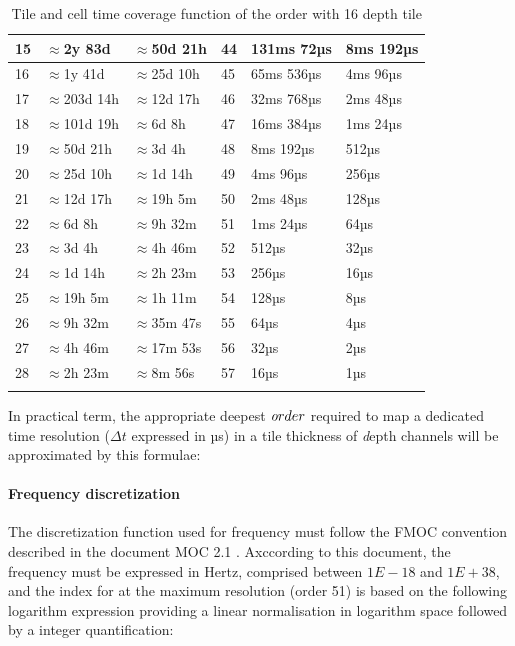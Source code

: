 \documentclass[11pt,a4paper]{ivoa}
\begin{document}
\begin{longtable}{|l|l|l||l|l|l|}
15 & $\approx$2y 83d & $\approx$50d 21h &
44 & 131ms 72µs & 8ms 192µs \\ \hline
16 & $\approx$1y 41d & $\approx$25d 10h &
45 & 65ms 536µs & 4ms 96µs \\ \hline
17 & $\approx$203d 14h & $\approx$12d 17h &
46 & 32ms 768µs & 2ms 48µs \\ \hline
18 & $\approx$101d 19h & $\approx$6d 8h &
47 & 16ms 384µs & 1ms 24µs \\ \hline
19 & $\approx$50d 21h & $\approx$3d 4h &
48 & 8ms 192µs & 512µs \\ \hline
20 & $\approx$25d 10h & $\approx$1d 14h &
49 & 4ms 96µs & 256µs \\ \hline
21 & $\approx$12d 17h & $\approx$19h 5m &
50 & 2ms 48µs & 128µs \\ \hline
22 & $\approx$6d 8h & $\approx$9h 32m &
51 & 1ms 24µs & 64µs \\ \hline
23 & $\approx$3d 4h & $\approx$4h 46m &
52 & 512µs & 32µs \\ \hline
24 & $\approx$1d 14h & $\approx$2h 23m &
53 & 256µs & 16µs \\ \hline
25 & $\approx$19h 5m & $\approx$1h 11m &
54 & 128µs & 8µs \\ \hline
26 & $\approx$9h 32m & $\approx$35m 47s &
55 & 64µs & 4µs \\ \hline
27 & $\approx$4h 46m & $\approx$17m 53s &
56 & 32µs & 2µs \\ \hline
28 & $\approx$2h 23m & $\approx$8m 56s &
57 & 16µs & 1µs \\ \hline


\caption{Tile and cell time coverage function of the order with 16 depth tile }
\label{tab:tabOrderTime}
\end{longtable}

In practical term, the appropriate deepest  ${\textit order}$ required to map a dedicated time resolution ($\Delta t$ expressed in µs) in a tile thickness of {\textit depth} channels will be approximated  by this formulae:\\
\medskip
\noindent{}
\medskip

\paragraph{Frequency discretization}
The discretization function used for frequency must follow the FMOC convention described in the document MOC 2.1 \citep{MOC2.1}. Axccording to this document, the frequency must be expressed in Hertz, comprised between $1E-18$ and $1E+38$, and the index for at the maximum resolution (order 51) is based on the following logarithm expression providing a linear normalisation in logarithm space followed by a integer quantification:
\end{document}
